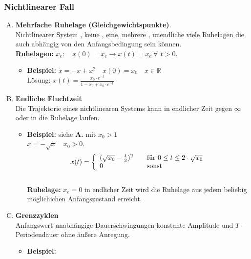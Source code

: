 \documentclass[11pt,a4paper]{article}
\begin{document}
\subsubsection{Nichtlinearer Fall}
\begin{enumerate}[(A)]
\item \textbf{Mehrfache Ruhelage (Gleichgewichtspunkte)}. \\
Nichtlinearer System , keine , eine, mehrere , unendliche viele Ruhelagen die auch abhängig von den Anfangsbedingung sein können.
\\ \textbf{Ruhelagen:} $x_{e}: \quad x(0) = x_{e} \rightarrow x(t) = x_{e} ~\forall \,~ t>0.$  
\begin{itemize}
\item\textbf{Beispiel:} $\dot{x} = -x + x^2 \quad x(0)= x_{0} \quad x \in \mathbb{R}$
\\
Lösung: $x(t)= \frac{x_{0} \cdot e^{-t}}{1- x_{0} + x_{0}\cdot e^{-t} }$
\begin{figure}[H] 
  \centering 
  \def\svgwidth{200pt} 
   
\end{figure} 
\end{itemize}
\item \textbf{Endliche Fluchtzeit}
\\
Die Trajektorie eines nichtlinearen Systems kann in endlicher Zeit gegen $\infty$ oder in die Ruhelage laufen.
\begin{itemize}
\item\textbf{Beispiel:} siehe \textbf{A.} mit $x_{0}>1$\\
$\dot{x} = - \sqrt{x} \quad x_{0} > 0. \quad $ \\
\[ x(t) = \left\{ 
  \begin{array}{l l}
    (\sqrt{x_{0}} - \frac{t}{2})^2 & \quad \text{für $0\leq t \leq 2\cdot \sqrt{x_{0}}$}\\
    0 & \quad \text{sonst}
  \end{array} \right.\] 
\\
\textbf{Ruhelage:} $x_{e}= 0 $ in endlicher Zeit wird die Ruhelage aus jedem beliebig möglichichen Anfangszustand erreicht.
\end{itemize}
\item\textbf{Grenzzyklen}\\
Anfangswert unabhängige Dauerschwingungen konstante Amplitude und $T-$Periodendauer ohne äußere Anregung.
\begin{itemize}
\item \textbf{Beispiel:}\\

\end{itemize}
\end{enumerate}
\end{document}
